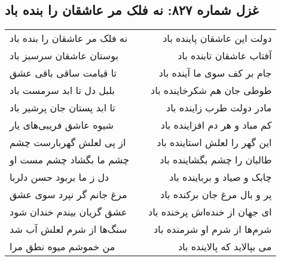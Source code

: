 \begin{center}
\section*{غزل شماره ۸۲۷: نه فلک مر عاشقان را بنده باد}
\label{sec:0827}
\begin{longtable}{l p{0.5cm} r}
نه فلک مر عاشقان را بنده باد
&&
دولت این عاشقان پاینده باد
\\
بوستان عاشقان سرسبز باد
&&
آفتاب عاشقان تابنده باد
\\
تا قیامت ساقی باقی عشق
&&
جام بر کف سوی ما آینده باد
\\
بلبل دل تا ابد سرمست باد
&&
طوطی جان هم شکرخاینده باد
\\
تا ابد پستان جان پرشیر باد
&&
مادر دولت طرب زاینده باد
\\
شیوه عاشق فریبی‌های یار
&&
کم مباد و هر دم افزاینده باد
\\
از پی لعلش گهربارست چشم
&&
این گهر را لعلش استاینده باد
\\
چشم ما بگشاد چشم مست او
&&
طالبان را چشم بگشاینده باد
\\
دل ز ما بربود حسن دلربا
&&
چابک و صیاد و برباینده باد
\\
مرغ جانم گر نپرد سوی عشق
&&
پر و بال مرغ جان برکنده باد
\\
عشق گریان بیندم خندان شود
&&
ای جهان از خنده‌اش پرخنده باد
\\
سنگ‌ها از شرم لعلش آب شد
&&
شرم‌ها از شرم او شرمنده باد
\\
من خموشم میوه نطق مرا
&&
می بپالاید که پالاینده باد
\\
\end{longtable}
\end{center}
